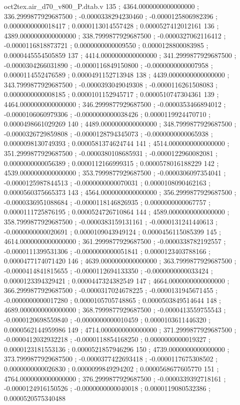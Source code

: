 \begin{filecontents}[overwrite]{oct2tex.air_d70_v800_P.dtab.v}
135 ; 4364.0000000000000000 ; 336.2999877929687500 ; -0.0000338294230460 ; -0.0000125806982396 ; 0.0000000000018417 ; 0.0000113014557428 ; 0.0000527412012161
136 ; 4389.0000000000000000 ; 338.7999877929687500 ; -0.0000327062116412 ; -0.0000116818873721 ; 0.0000000000009550 ; 0.0000128800083985 ; 0.0000445554505859
137 ; 4414.0000000000000000 ; 341.2999877929687500 ; -0.0000304266031890 ; -0.0000116849150800 ; -0.0000000000007958 ; 0.0000114552476589 ; 0.0000491152713948
138 ; 4439.0000000000000000 ; 343.7999877929687500 ; -0.0000393049049308 ; -0.0000116261508083 ; 0.0000000000008185 ; 0.0000101152945717 ; 0.0000510747304361
139 ; 4464.0000000000000000 ; 346.2999877929687500 ; -0.0000353466894012 ; -0.0000106060979306 ; -0.0000000000038426 ; 0.0000119924470710 ; 0.0000498661029269
140 ; 4489.0000000000000000 ; 348.7999877929687500 ; -0.0000326729859808 ; -0.0000128794345073 ; -0.0000000000065938 ; 0.0000098130749393 ; 0.0000581374624744
141 ; 4514.0000000000000000 ; 351.2999877929687500 ; -0.0000380108685931 ; -0.0000122960082081 ; 0.0000000000056389 ; 0.0000112166999315 ; 0.0000578016188229
142 ; 4539.0000000000000000 ; 353.7999877929687500 ; -0.0000306097354041 ; -0.0000125987844513 ; -0.0000000000070031 ; 0.0000108090462163 ; 0.0000560375665373
143 ; 4564.0000000000000000 ; 356.2999877929687500 ; -0.0000336951088684 ; -0.0000118146826935 ; 0.0000000000067757 ; 0.0000111725876195 ; 0.0000524726710864
144 ; 4589.0000000000000000 ; 358.7999877929687500 ; -0.0000383159131161 ; -0.0000131241440613 ; -0.0000000000020691 ; 0.0000109043949124 ; 0.0000456115085399
145 ; 4614.0000000000000000 ; 361.2999877929687500 ; -0.0000338782192557 ; -0.0000111399531306 ; -0.0000000000051841 ; 0.0000123403788166 ; 0.0000477174071420
146 ; 4639.0000000000000000 ; 363.7999877929687500 ; -0.0000414841815655 ; -0.0000112694133350 ; -0.0000000000033424 ; 0.0000123394329421 ; 0.0000447324382549
147 ; 4664.0000000000000000 ; 366.2999877929687500 ; -0.0000317024678225 ; -0.0000131945671455 ; -0.0000000000017280 ; 0.0000105705748865 ; 0.0000503849514644
148 ; 4689.0000000000000000 ; 368.7999877929687500 ; -0.0000413559755543 ; -0.0000120698559840 ; -0.0000000000010459 ; 0.0000103611446320 ; 0.0000562144959986
149 ; 4714.0000000000000000 ; 371.2999877929687500 ; -0.0000412032932218 ; -0.0000118854168250 ; 0.0000000000019327 ; 0.0000123181553136 ; 0.0000521857946296
150 ; 4739.0000000000000000 ; 373.7999877929687500 ; -0.0000377422693418 ; -0.0000117675308502 ; 0.0000000000026830 ; 0.0000099849294202 ; 0.0000568677605770
151 ; 4764.0000000000000000 ; 376.2999877929687500 ; -0.0000339392718161 ; -0.0000124916150526 ; -0.0000000000040018 ; 0.0000119080532386 ; 0.0000520575340488

\end{filecontents}
